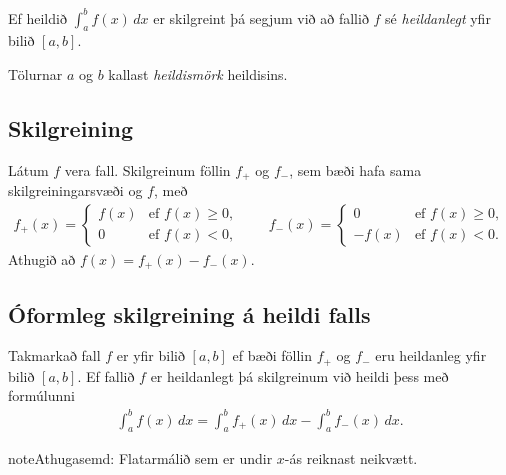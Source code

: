 \documentclass[a4paper,10pt,icelandic]{sphinxmanual}
\begin{document}
Ef heildið \(\int_a^b f(x)\,dx\) er skilgreint þá segjum við að
fallið \(f\) sé \textit{heildanlegt} yfir bilið \([a,b]\).

Tölurnar \(a\) og \(b\) kallast \textit{heildismörk} heildisins.


\subsection{Skilgreining}
\label{\detokenize{kafli06:skilgreining}}
Látum \(f\) vera fall. Skilgreinum föllin \(f_+\) og
\(f_-\), sem bæði hafa sama skilgreiningarsvæði og \(f\), með
\begin{equation*}
\begin{split}f_+(x)=\left\{\begin{array}{ll} f(x) & \mbox{ef }f(x)\geq 0,\\
  0 & \mbox{ef }f(x)<0, \end{array} \right. \qquad
  f_-(x)=\left\{\begin{array}{ll} 0 & \mbox{ef }f(x)\geq 0,\\
  -f(x) & \mbox{ef }f(x)<0. \end{array}\right.\end{split}
\end{equation*}
Athugið að \(f(x)=f_+(x)-f_-(x)\).



\subsection{Óformleg skilgreining á heildi falls}
\label{\detokenize{kafli06:oformleg-skilgreining-a-heildi-falls}}
Takmarkað fall \(f\) er  yfir bilið \([a, b]\) ef
bæði föllin \(f_+\) og \(f_-\) eru heildanleg yfir bilið
\([a,
b]\). Ef fallið \(f\) er heildanlegt þá skilgreinum við heildi þess
með formúlunni
\begin{equation*}
\begin{split}\int_a^b f(x)\,dx=\int_a^b f_+(x)\,dx-\int_a^b f_-(x)\,dx.\end{split}
\end{equation*}
\begin{sphinxadmonition}{note}{Athugasemd:}
Flatarmálið sem er undir \(x\)-ás reiknast neikvætt.
\end{sphinxadmonition}
\end{document}

